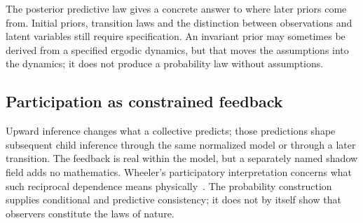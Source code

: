 The posterior predictive law gives a concrete answer to where later priors come from. Initial priors, transition laws and the distinction between observations and latent variables still require specification. An invariant prior may sometimes be derived from a specified ergodic dynamics, but that moves the assumptions into the dynamics; it does not produce a probability law without assumptions.

\subsection{Participation as constrained feedback}
Upward inference changes what a collective predicts; those predictions shape subsequent child inference through the same normalized model or through a later transition. The feedback is real within the model, but a separately named shadow field adds no mathematics. Wheeler's participatory interpretation concerns what such reciprocal dependence means physically~\cite{Wheeler1990}. The probability construction supplies conditional and predictive consistency; it does not by itself show that observers constitute the laws of nature.

